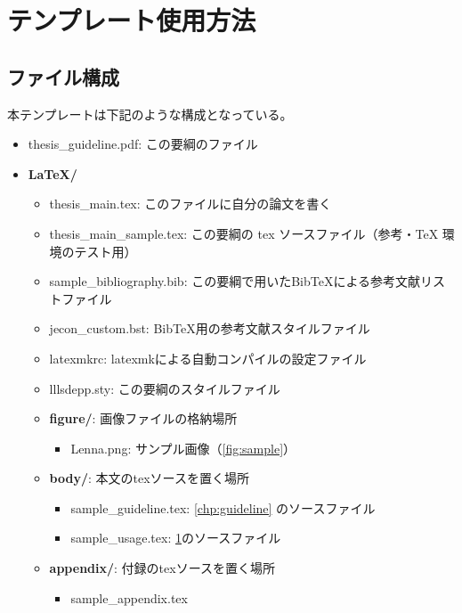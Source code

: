 
\chapter{テンプレート使用方法}
	\label{chp:readme}

	\section{ファイル構成}
		\label{sec:contents}

		本テンプレートは下記のような構成となっている。

		\begin{itemize}
			\ttfamily
			\item thesis\_guideline.pdf: この要綱のファイル
			\item \textbf{LaTeX/}
			\begin{itemize}
				\item thesis\_main.tex: このファイルに自分の論文を書く
				\item thesis\_main\_sample.tex: この要綱の tex ソースファイル（参考・\TeX{} 環境のテスト用）
				\item sample\_bibliography.bib: この要綱で用いたBibTeXによる参考文献リストファイル
				\item jecon\_custom.bst: BibTeX用の参考文献スタイルファイル
				\item latexmkrc: latexmkによる自動コンパイルの設定ファイル
				\item lllsdepp.sty: この要綱のスタイルファイル
				\item \textbf{figure/}: 画像ファイルの格納場所
					\begin{itemize}
						\item Lenna.png: サンプル画像（\cref{fig:sample}）
					\end{itemize}
				\item \textbf{body/}: 本文のtexソースを置く場所
					\begin{itemize}
						\item sample\_guideline.tex: \cref{chp:guideline} のソースファイル
						\item sample\_usage.tex: \cref{chp:readme}のソースファイル
					\end{itemize}
				\item \textbf{appendix/}: 付録のtexソースを置く場所
					\begin{itemize}
						\item sample\_appendix.tex
					\end{itemize}

\end{itemize}
\end{itemize}
